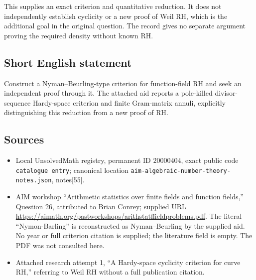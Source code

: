 \documentclass[11pt]{article}
\begin{document}
This supplies an exact criterion and quantitative reduction. It does not independently establish cyclicity or a new proof of Weil RH, which is the additional goal in the original question. The record gives no separate argument proving the required density without known RH.
\subsection{Short English statement}
Construct a Nyman--Beurling-type criterion for function-field RH and seek an independent proof through it. The attached aid reports a pole-killed divisor-sequence Hardy-space criterion and finite Gram-matrix annuli, explicitly distinguishing this reduction from a new proof of RH.
\subsection{Sources}
\begin{itemize}
\item Local UnsolvedMath registry, permanent ID \(20000404\), exact public code \texttt{catalogue entry}; canonical location \texttt{aim-algebraic-number-theory-notes.json}, notes[55].
\item AIM workshop ``Arithmetic statistics over finite fields and function fields,'' Question 26, attributed to Brian Conrey; supplied URL \url{https://aimath.org/pastworkshops/arithstatffieldproblems.pdf}. The literal ``Nymon-Barling'' is reconstructed as Nyman--Beurling by the supplied aid. No year or full criterion citation is supplied; the literature field is empty. The PDF was not consulted here.
\item Attached research attempt 1, ``A Hardy-space cyclicity criterion for curve RH,'' referring to Weil RH without a full publication citation.
\end{itemize}
\end{document}
